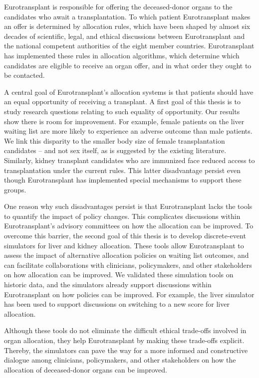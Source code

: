 \documentclass[11pt,twoside,]{book}
\begin{document}
Eurotransplant is responsible for offering the deceased-donor organs to
the candidates who await a transplantation. To which patient Eurotransplant makes
an offer is determined by allocation rules, which have been shaped by almost six decades of
scientific, legal, and ethical discussions between Eurotransplant and
the national competent authorities of the eight member countries. Eurotransplant
has implemented these rules in allocation algorithms, which determine which candidates
are eligible to receive an organ offer, and in what order they ought to be contacted.

A central goal of Eurotransplant's allocation systems is that patients should have an equal opportunity
of receiving a transplant. A first goal of this thesis is to study research questions
relating to such equality of opportunity. Our results show there is room
for improvement. For example, female patients on the liver waiting list are more
likely to experience an adverse outcome than male patients. We link
this disparity to the smaller body size of female transplantation candidates --
and not sex itself, as is suggested by the existing literature. Similarly,
kidney transplant candidates who are immunized face reduced access to transplantation
under the current rules. This latter disadvantage persist even though Eurotransplant
has implemented special mechanisms to support these groups.

One reason why such disadvantages persist is that Eurotransplant lacks the tools
to quantify the impact of policy changes. This complicates discussions within
Eurotransplant's advisory committees on how the allocation can be improved. To
overcome this barrier, the second goal of this thesis is to develop discrete-event
simulators for liver and kidney allocation. These tools allow Eurotransplant
to assess the impact of alternative allocation policies on waiting list outcomes,
and can facilitate collaborations with clinicians, policymakers, and other stakeholders on how
allocation can be improved. We validated these simulation
tools on historic data, and the simulators already support discussions within
Eurotransplant on how policies can be improved. For example, the liver simulator
has been used to support discussions on switching to a new score for liver allocation.

Although these tools do not eliminate the difficult ethical trade-offs involved
in organ allocation, they help Eurotransplant by making these trade-offs explicit.
Thereby, the simulators can pave the way for a more informed and constructive dialogue
among clinicians, policymakers, and other stakeholders on how the allocation of
deceased-donor organs can be improved.
\end{document}
